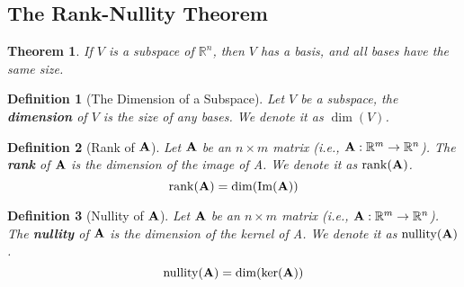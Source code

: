\documentclass[12pt, a4paper]{article}
\newtheorem{thm}{Theorem}[subsection]
\newtheorem{df}{Definition}[subsection]
\def\R{{\mathbb{R}}}
\def\IM{{\mathrm{Im}}}
\def\rank{\mathrm{rank}}
\def\nullity{\mathrm{nullity}}
\def\matrixA{\vb{A}}
\begin{document}
\subsection{The Rank-Nullity Theorem}
\begin{thm} 
	If $V$ is a subspace of $\R^n$, then $V$ has a basis, and all bases have the same size. 
\end{thm}
\begin{df}[The Dimension of a Subspace]
	Let $V$ be a subspace, the \textbf{dimension} of $V$ is the size of any bases. We denote it as $\dim(V)$. 
\end{df}
\begin{df}[Rank of $\matrixA$]
	Let $\matrixA$ be an $n\times m$ matrix (i.e., $\matrixA:\R^m\to\R^n$). The \textbf{rank} of $\matrixA$ is the dimension of the image of A. We denote it as $\rank(\matrixA)$. \[\rank(\matrixA)=\dim(\IM(\matrixA))\]
\end{df}
\begin{df}[Nullity of $\matrixA$]
	Let $\matrixA$ be an $n\times m$ matrix (i.e., $\matrixA:\R^m\to\R^n$). The \textbf{nullity} of $\matrixA$ is the dimension of the kernel of A. We denote it as $\nullity(\matrixA)$. \[\nullity(\matrixA)=\dim(\ker(\matrixA))\]
\end{df}
\end{document}
